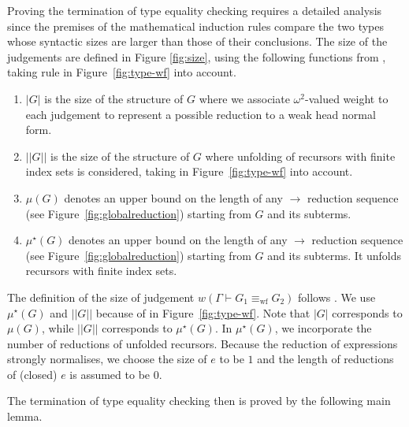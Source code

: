 \documentclass{LMCS}
\newcommand{\redsym}{\ensuremath{\longrightarrow}}
\newcommand{\G}{\ensuremath{G}}
\newcommand{\trule}[1]{\text{\footnotesize{\ensuremath{\lfloor\text{\sc{#1}}\rfloor}}}}
\newcommand{\proves}{\vdash}                        \newcommand{\judg}{{J}}
\newcommand{\equivwf}{\equiv_{\text{wf}}}
\newcommand{\termsize}[1]{|#1|}
\newcommand{\inductiontermsize}[1]{\vert\vert #1 \vert\vert}
\newcommand{\judgementsize}[1]{w(#1)}
\newcommand{\reductionsize}[1]{\mu(#1)}
\newcommand{\inductionreductionsize}[1]{\mu^\star(#1)}
\begin{document}
 
Proving the termination of type equality checking requires 
a detailed analysis 
since the premises of the mathematical induction 
rules compare the two types whose syntactic sizes are larger 
than those of their conclusions. 
The size of the judgements are defined 
in Figure \ref{fig:size}, 
using the following functions from \cite[\S~2.4.3]{DependentBook}, 
taking rule \trule{WfRecF} in Figure~\ref{fig:type-wf} into account. 
\begin{enumerate}[(1)]
\item $\termsize{G}$ is the size of the structure of $G$ 
where we associate $\omega^2$-valued weight to each judgement 
to represent a possible reduction to a weak head normal form. 

\item $\inductiontermsize{G}$ is the size of the structure of $G$ 
where unfolding of recursors with finite index sets is considered,
taking \trule{WfRecF} in Figure~\ref{fig:type-wf} into account. 

\item $\reductionsize{\G}$ 
denotes an upper bound on the length of any 
$\redsym$ reduction sequence (see Figure~\ref{fig:globalreduction})  
starting from $G$ and its subterms.

\item $\inductionreductionsize{\G}$ 
denotes an upper bound on the length of any 
$\redsym$ reduction sequence (see Figure~\ref{fig:globalreduction})  
starting from $G$ and its subterms.  
It unfolds recursors with finite index sets. 
\end{enumerate}
The definition of the size of judgement 
$\judgementsize{\Gamma \proves G_1 \equivwf G_2}$ 
follows \cite[\S~2.4.3]{DependentBook}. 
We use $\inductionreductionsize{\G}$ and $\inductiontermsize{G}$ 
because of \trule{WfRecF} in Figure~\ref{fig:type-wf}. 
Note that $\termsize{G}$ corresponds to $\reductionsize{\G}$, 
 while $\inductiontermsize{G}$ corresponds to
$\inductionreductionsize{\G}$.  In $\inductionreductionsize{\G}$, 
we incorporate the number of reductions of unfolded 
recursors. Because the reduction of expressions 
strongly normalises, we choose the size of $e$ to be $1$ and 
the length of reductions of (closed) $e$ is assumed to be $0$.

The termination of type equality checking then is proved by the following main
lemma.  
\end{document}
